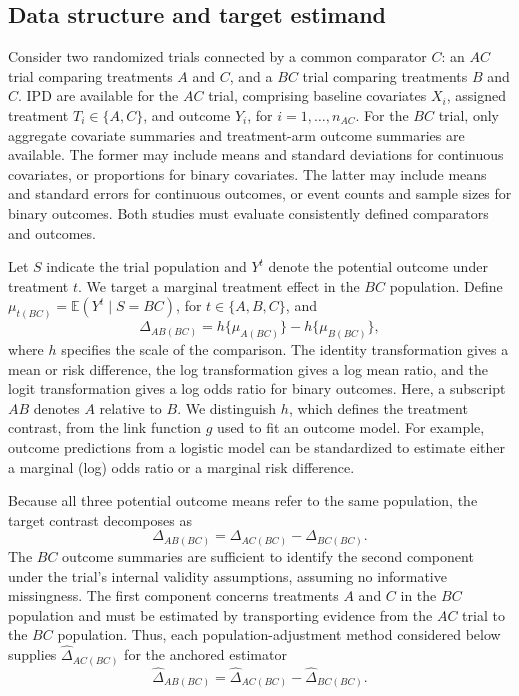 \documentclass[article]{jss}
\begin{document}
\subsection{Data structure and target estimand}
\label{ssec:problem_formulation}
Consider two randomized trials connected by a common comparator $C$: an $AC$ trial comparing treatments $A$ and $C$, and a $BC$ trial comparing treatments $B$ and $C$. IPD are available for the $AC$ trial, comprising baseline covariates $X_i$, assigned treatment $T_i \in \{A,C\}$, and outcome $Y_i$, for $i=1,\ldots,n_{AC}$. For the $BC$ trial, only aggregate covariate summaries and treatment-arm outcome summaries are available. The former may include means and standard deviations for continuous covariates, or proportions for binary covariates. The latter may include means and standard errors for continuous outcomes, or event counts and sample sizes for binary outcomes. Both studies must evaluate consistently defined comparators and outcomes.

Let $S$ indicate the trial population and $Y^t$ denote the potential outcome under treatment $t$. We target a marginal treatment effect in the $BC$ population. Define $\mu_{t(BC)}=\mathbb{E}(Y^t\mid S=BC)$, for $t\in\{A,B,C\}$, and
\begin{equation}
\label{eqn:relative_treatment_effect}
\Delta_{AB(BC)}=h\{\mu_{A(BC)}\}-h\{\mu_{B(BC)}\},
\end{equation}
where $h$ specifies the scale of the comparison. The identity transformation gives a mean or risk difference, the log transformation gives a log mean ratio, and the logit transformation gives a log odds ratio for binary outcomes. Here, a subscript $AB$ denotes $A$ relative to $B$. We distinguish $h$, which defines the treatment contrast, from the link function $g$ used to fit an outcome model. For example, outcome predictions from a logistic model can be standardized to estimate either a marginal (log) odds ratio or a marginal risk difference.

Because all three potential outcome means refer to the same population, the target contrast decomposes as
\begin{equation}
\label{eqn:anchored-decomposition}
\Delta_{AB(BC)}=\Delta_{AC(BC)}-\Delta_{BC(BC)}.
\end{equation}
The $BC$ outcome summaries are sufficient to identify the second component under the trial's internal validity assumptions, assuming no informative missingness. The first component concerns treatments $A$ and $C$ in the $BC$ population and must be estimated by transporting evidence from the $AC$ trial to the $BC$ population. Thus, each population-adjustment method considered below supplies $\widehat\Delta_{AC(BC)}$ for the anchored estimator
\begin{equation}
\label{eqn:paic}
\widehat\Delta_{AB(BC)}=\widehat\Delta_{AC(BC)}-\widehat\Delta_{BC(BC)}.
\end{equation}
\end{document}
